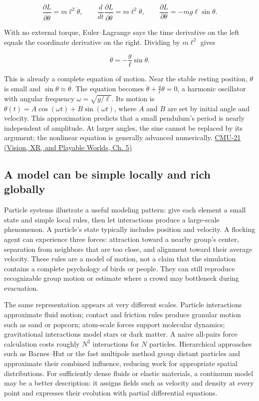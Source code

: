 \[
\frac{\partial L}{\partial\dot\theta}=m\ell^2\dot\theta,\qquad
\frac{d}{dt}\frac{\partial L}{\partial\dot\theta}=m\ell^2\ddot\theta,\qquad
\frac{\partial L}{\partial\theta}=-mg\ell\sin\theta.
\]

With no external torque, Euler--Lagrange says the time derivative on the left equals the coordinate derivative on the right. Dividing by \(m\ell^2\) gives

\[
\ddot\theta=-\frac{g}{\ell}\sin\theta.
\]

This is already a complete equation of motion. Near the stable resting position, \(\theta\) is small and \(\sin\theta\approx\theta\). The equation becomes \(\ddot\theta+\frac{g}{\ell}\theta=0\), a harmonic oscillator with angular frequency \(\omega=\sqrt{g/\ell}\). Its motion is \(\theta(t)=A\cos(\omega t)+B\sin(\omega t)\), where \(A\) and \(B\) are set by initial angle and velocity. This approximation predicts that a small pendulum's period is nearly independent of amplitude. At larger angles, the sine cannot be replaced by its argument; the nonlinear equation is generally advanced numerically. \href{../07-Vision-XR-and-Playable-Worlds/main.pdf\#nameddest=04-visual-computing-ii-ch036-cmu-21---dynamics-and-time-integration}{CMU-21 (Vision, XR, and Playable Worlds, Ch. 5)}

\subsection{A model can be simple locally and rich globally}\label{04-visual-computing-ii-ch029-a-model-can-be-simple-locally-and-rich-globally}

\hypertarget{04-visual-computing-ii-ch029-a-model-can-be-simple-locally-and-rich-globally}{}

Particle systems illustrate a useful modeling pattern: give each element a small state and simple local rules, then let interactions produce a large-scale phenomenon. A particle's state typically includes position and velocity. A flocking agent can experience three forces: attraction toward a nearby group's center, separation from neighbors that are too close, and alignment toward their average velocity. These rules are a model of motion, not a claim that the simulation contains a complete psychology of birds or people. They can still reproduce recognizable group motion or estimate where a crowd may bottleneck during evacuation.

The same representation appears at very different scales. Particle interactions approximate fluid motion; contact and friction rules produce granular motion such as sand or popcorn; atom-scale forces support molecular dynamics; gravitational interactions model stars or dark matter. A naive all-pairs force calculation costs roughly \(N^2\) interactions for \(N\) particles. Hierarchical approaches such as Barnes--Hut or the fast multipole method group distant particles and approximate their combined influence, reducing work for appropriate spatial distributions. For sufficiently dense fluids or elastic materials, a continuum model may be a better description: it assigns fields such as velocity and density at every point and expresses their evolution with partial differential equations.

